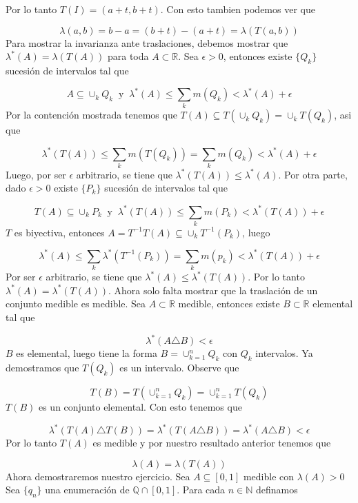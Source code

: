 \documentclass[12pt]{article}
\begin{document}
    Por lo tanto $T(I) = (a+t,b+t)$. Con esto tambien podemos ver que 

    \[\lambda (a,b) = b-a = (b+t)-(a+t) = \lambda (T(a,b))\]
    Para mostrar la invarianza ante traslaciones, debemos mostrar que 
    $\lambda^*(A) = \lambda (T(A))$ para toda $A\subset \mathbb{R}$. Sea $\epsilon > 0$, 
    entonces existe $\{Q_k\}$ sucesi\'on de intervalos tal que 

    \[A\subseteq \cup_k Q_k\;\; \mathrm{y}\;\; \lambda^*(A) \leq \sum_k m(Q_k) < \lambda^* (A)+ \epsilon\]
    Por la contenci\'on mostrada tenemos que $T(A) \subseteq T(\cup_k Q_k) = \cup_k T(Q_k)$, 
    asi que 

    \[\lambda^* (T(A)) \leq \sum_k m(T(Q_k)) = \sum_k m(Q_k) < \lambda^*(A)+\epsilon\]
    Luego, por ser $\epsilon$ arbitrario, se tiene que $\lambda^*(T(A)) \leq \lambda^* (A)$.
    Por otra parte, dado $\epsilon > 0$ existe $\{P_k\}$ sucesi\'on de intervalos tal que 

    \[T(A)\subseteq \cup_k P_k\;\; \mathrm{y}\;\; \lambda^*(T(A)) \leq \sum_k m(P_k) < \lambda^*(T(A))+\epsilon\]
    $T$ es biyectiva, entonces $A = T^{-1}T(A) \subseteq \cup_k T^{-1} (P_k)$, luego

    \[\lambda^*(A) \leq \sum_k \lambda^*(T^{-1}(P_k)) = \sum_k m(p_k) < \lambda^*(T(A))+\epsilon\]
    Por ser $\epsilon$ arbitrario, se tiene que $\lambda^*(A) \leq \lambda^*(T(A))$. Por lo 
    tanto $\lambda^*(A) = \lambda^*(T(A))$. Ahora solo falta mostrar que la traslaci\'on de 
    un conjunto medible es medible. Sea $A\subset \mathbb{R}$ medible, entonces existe
    $B\subset \mathbb{R}$ elemental tal que 

    \[\lambda^* (A\triangle B) < \epsilon\]
    $B$ es elemental, luego tiene la forma $B = \cup_{k=1}^n Q_k$ con $Q_k$ intervalos. Ya 
    demostramos que $T(Q_k)$ es un intervalo. Observe que 

    \[T(B) = T(\cup_{k=1}^n Q_k) = \cup_{k=1}^n T(Q_k)\]
    $T(B)$ es un conjunto elemental. Con esto tenemos que 

    \[\lambda^*(T(A)\triangle T(B)) = \lambda^*(T(A\triangle B)) = \lambda^* (A\triangle B) < \epsilon\]
    Por lo tanto $T(A)$ es medible y por nuestro resultado anterior tenemos que 

    \[\lambda (A) = \lambda (T(A))\]
    Ahora demostraremos nuestro ejercicio. Sea $A\subseteq [0,1]$ medible con $\lambda (A) > 0$
    Sea $\{q_n\}$ una enumeraci\'on de $\mathbb{Q}\cap [0,1]$. Para cada $n\in \mathbb{N}$
    definamos 
\end{document}
